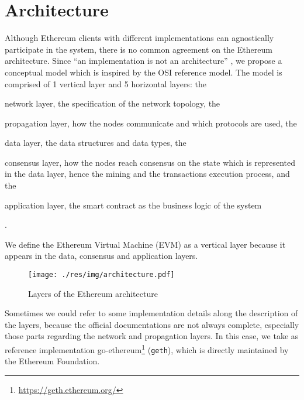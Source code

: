 \section{Architecture}

Although Ethereum clients with different implementations can agnostically
participate in the system, there is no common agreement on the Ethereum
architecture. Since ``an implementation is not an architecture''
\cite{bib:art-of-scalability}, we propose a conceptual model which is inspired
by the OSI reference model. The model is comprised of 1 vertical layer and 5
horizontal layers: the
\begin{enumerate*}[label=(\arabic*)]
  \item network layer, the specification of the network topology, the
  \item propagation layer, how the nodes communicate and which protocols
  are used, the
  \item data layer, the data structures and data types, the
  \item consensus layer, how the nodes reach consensus on the state which is
  represented in the data layer, hence the mining and the transactions execution
  process, and the
  \item application layer, the smart contract as the business logic of the
  system
\end{enumerate*}.

We define the Ethereum Virtual Machine (EVM) as a vertical layer because it
appears in the data, consensus and application layers.

\begin{figure}[H]
	\begin{center}
		\texttt{[image: ./res/img/architecture.pdf]}
	\end{center}
	\caption{Layers of the Ethereum architecture}
	\label{fig:architecture}
\end{figure}

Sometimes we could refer to some implementation details along the description of
the layers, because the official documentations are not always complete,
especially those parts regarding the network and propagation layers. In this
case, we take as reference implementation
go-ethereum\footnote{\url{https://geth.ethereum.org/}} (\texttt{geth}), which is
directly maintained by the Ethereum Foundation.







